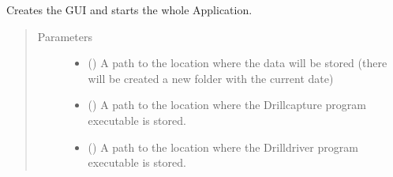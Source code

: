 \documentclass[letterpaper,10pt,english]{sphinxmanual}
\begin{document}

\begin{fulllineitems}
\label{\detokenize{anoog.automation:anoog.automation.graphical_user_interface.run}}
\sphinxAtStartPar
Creates the GUI and starts the whole Application.
\begin{quote}\begin{description}
\item[{Parameters}] \leavevmode\begin{itemize}
\item {} 
\sphinxAtStartPar
{} (\sphinxstyleliteralemphasis{\sphinxupquote{, }}) \textendash{} A path to the location where the data will be stored (there will be created a new folder with the current date)

\item {} 
\sphinxAtStartPar
{} (\sphinxstyleliteralemphasis{\sphinxupquote{, }}) \textendash{} A path to the location where the Drillcapture program executable is stored.

\item {} 
\sphinxAtStartPar
{} (\sphinxstyleliteralemphasis{\sphinxupquote{, }}) \textendash{} A path to the location where the Drilldriver program executable is stored.


\end{itemize}
\end{description}
\end{quote}
\end{fulllineitems}
\end{document}
